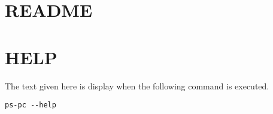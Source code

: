 \section{README}



\newpage

\section{HELP}



The text given here is display when the following command is executed.
\begin{verbatim}
ps-pc --help
\end{verbatim} 

